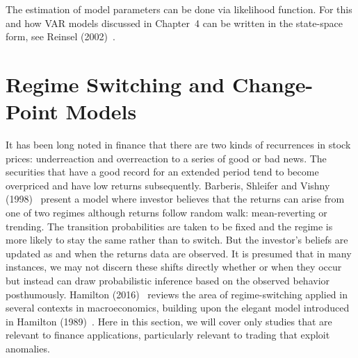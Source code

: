 The estimation of model parameters can be done via likelihood function. For this and how VAR models discussed in Chapter~4 can be written in the state-space form, see Reinsel (2002)~\cite{2002reinsel}.



\section{Regime Switching and Change-Point Models}


It has been long noted in finance that there are two kinds of recurrences in stock prices: underreaction and overreaction to a series of good or bad news.\label{in:regime} The securities that have a good record for an extended period tend to become overpriced and have low returns subsequently. Barberis, Shleifer and Vishny (1998)~\cite{vishny} present a model where investor believes that the returns can arise from one of two regimes although returns follow random walk: mean-reverting or trending. The transition probabilities are taken to be fixed and the regime is more likely to stay the same rather than to switch. But the investor's beliefs are updated as and when the returns data are observed. It is presumed that in many instances, we may not discern these shifts directly whether or when they occur but instead can draw probabilistic inference based on the observed behavior posthumously. Hamilton (2016)~\cite{jdham} reviews the area of regime-switching applied in several contexts in macroeconomics, building upon the elegant model introduced in Hamilton (1989)~\cite{89ham}. Here in this section, we will cover only studies that are relevant to finance applications, particularly relevant to trading that exploit anomalies. 


